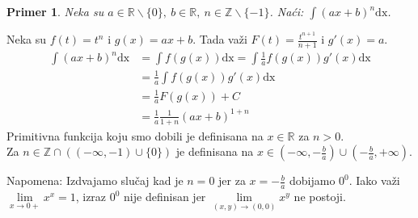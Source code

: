 \documentclass{article}
\newtheorem{prim}{Primer}[section]
\begin{document}
\begin{primbox}
    \begin{prim}
        Neka su $a \in \mathbb{R}\backslash\{0\},\ b\in\mathbb{R},\ n \in \mathbb{Z}\backslash\{-1\}$. Naći: $\int(ax + b)^n\text{dx}$.
    \end{prim}
    Neka su $f(t) = t^n$ i $g(x) = ax+b$. Tada važi $F(t) = \frac{t^{n+1}}{n+1}$ i $g'(x) = a$.
    \begin{align*}
        \int(ax + b)^n\text{dx} & = \int f(g(x))\text{dx} = \int\frac{1}{a}f(g(x))g'(x)\text{dx}
        \\ & = \frac{1}{a}\int f(g(x))g'(x)\text{dx}
        \\ & = \frac{1}{a}F(g(x)) + C
        \\ & = \frac{1}{a}\frac{1}{1+n}(ax + b)^{1+n}
    \end{align*}
    Primitivna funkcija koju smo dobili je definisana na $x \in \mathbb{R}$ za $n > 0$.\\
    Za $n\in \mathbb{Z} \cap ((-\infty, -1)\cup\{0\})$ je definisana na $x \in (-\infty, -\frac{b}{a})\cup(-\frac{b}{a}, +\infty)$.\par
    Napomena: Izdvajamo slučaj kad je $n=0$ jer za $x=-\frac{b}{a}$ dobijamo $0^0$. Iako važi $\lim\limits_{x\longrightarrow0+}x^x = 1$, izraz
    $0^0$ nije definisan jer $\lim\limits_{(x, y)\longrightarrow(0,0)} x^y$ ne postoji.
\end{primbox}
\end{document}
